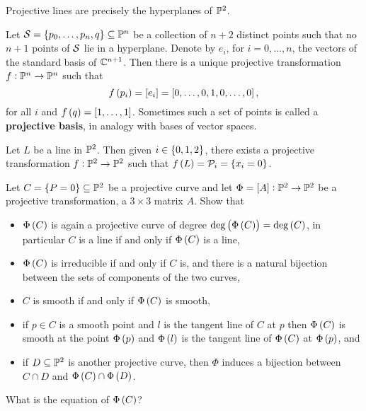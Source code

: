 \begin{example}
Projective lines are precisely the hyperplanes of $ \P^2 $.
\end{example}

\begin{exercise}
Let $ \SS = \cbr{p_0, \dots, p_n, q} \subseteq \P^n $ be a collection of $ n + 2 $ distinct points such that no $ n + 1 $ points of $ \SS $ lie in a hyperplane. Denote by $ e_i $, for $ i = 0, \dots, n $, the vectors of the standard basis of $ \C^{n + 1} $. Then there is a unique projective transformation $ f : \P^n \to \P^n $ such that
$$ f\br{p_i} = \sbr{e_i} = \sbr{0, \dots, 0, 1, 0, \dots, 0}, $$
for all $ i $ and $ f\br{q} = \sbr{1, \dots, 1} $. Sometimes such a set of points is called a \textbf{projective basis}, in analogy with bases of vector spaces.
\end{exercise}

\begin{exercise}
Let $ L $ be a line in $ \P^2 $. Then given $ i \in \cbr{0, 1, 2} $, there exists a projective transformation $ f : \P^2 \to \P^2 $ such that $ f\br{L} = \PP_i = \cbr{x_i = 0} $.
\end{exercise}

\begin{exercise}
\label{ex:29}
Let $ C = \cbr{P = 0} \subseteq \P^2 $ be a projective curve and let $ \Phi = \sbr{A} : \P^2 \to \P^2 $ be a projective transformation, a $ 3 \times 3 $ matrix $ A $. Show that
\begin{itemize}
\item $ \Phi\br{C} $ is again a projective curve of degree $ \deg\br{\Phi\br{C}} = \deg\br{C} $, in particular $ C $ is a line if and only if $ \Phi\br{C} $ is a line,
\item $ \Phi\br{C} $ is irreducible if and only if $ C $ is, and there is a natural bijection between the sets of components of the two curves,
\item $ C $ is smooth if and only if $ \Phi\br{C} $ is smooth,
\item if $ p \in C $ is a smooth point and $ l $ is the tangent line of $ C $ at $ p $ then $ \Phi\br{C} $ is smooth at the point $ \Phi\br{p} $ and $ \Phi\br{l} $ is the tangent line of $ \Phi\br{C} $ at $ \Phi\br{p} $, and
\item if $ D \subseteq \P^2 $ is another projective curve, then $ \Phi $ induces a bijection between $ C \cap D $ and $ \Phi\br{C} \cap \Phi\br{D} $.
\end{itemize}
What is the equation of $ \Phi\br{C} $?
\end{exercise}

